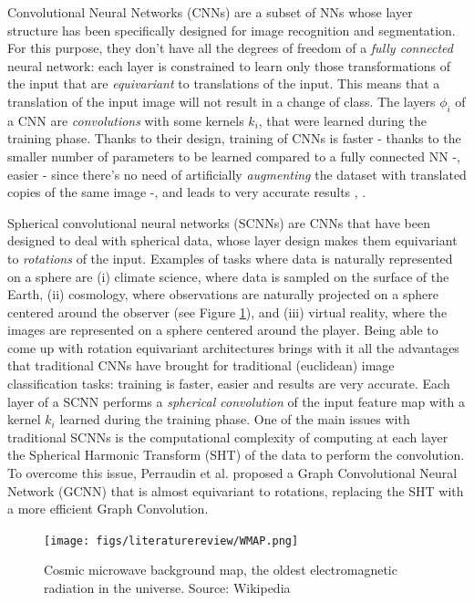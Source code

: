 Convolutional Neural Networks (CNNs) are a subset of NNs whose layer structure has been specifically designed for image recognition and segmentation. For this purpose, they don't have all the degrees of freedom of a \textit{fully connected} neural network: each layer is constrained to learn only those transformations of the input that are \textit{equivariant} to translations of the input. This means that a translation of the input image will not result in a change of class. The layers $\phi_i$ of a CNN are \textit{convolutions} with some kernels $k_i$, that were learned during the training phase. Thanks to their design, training of CNNs is faster - thanks to the smaller number of parameters to be learned compared to a fully connected NN -, easier - since there's no need of artificially \textit{augmenting} the dataset with translated copies of the same image -, and leads to very accurate results \cite{SCNN}, \cite{Esteves}.

Spherical convolutional neural networks (SCNNs) are CNNs that have been designed to deal with spherical data, whose layer design makes them equivariant to \textit{rotations} of the input.  Examples of tasks where data is naturally represented on a sphere are (i) climate science, where data is sampled on the surface of the Earth, (ii) cosmology, where observations are naturally projected on a sphere centered around the observer (see Figure \ref{fig:cosmicradiation}), and (iii) virtual reality, where the images are represented on a sphere centered around the player. Being able to come up with rotation equivariant architectures brings with it all the advantages that traditional CNNs have brought for traditional (euclidean) image classification tasks: training is faster, easier and results are very accurate. Each layer of a SCNN performs a \textit{spherical convolution} of the input feature map with a kernel $k_i$ learned during the training phase. One of the main issues with traditional SCNNs is the computational complexity of computing at each layer the Spherical Harmonic Transform (SHT) of the data to perform the convolution. To overcome this issue, Perraudin et al. \cite{DeepSphere} proposed a Graph Convolutional Neural Network (GCNN) that is almost equivariant to rotations, replacing the SHT with a more efficient Graph Convolution.
\begin{figure}
	\centering
	\caption{\label{fig:cosmicradiation} Cosmic microwave background map, the oldest electromagnetic radiation in the universe. Source: Wikipedia}
	\texttt{[image: figs/literaturereview/WMAP.png]}
\end{figure}


